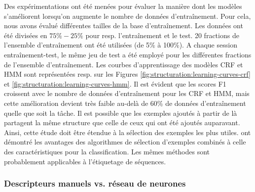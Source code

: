 Des expérimentations ont été menées pour évaluer la manière dont les modèles s'améliorent lorsqu'on augmente le nombre de données d'entraînement. Pour cela, nous avons évalué différentes tailles de la base d'entraînement. Les données ont été divisées en $75\%-25\%$ pour resp. l'entraînement et le test. 20 fractions de l'ensemble d'entraînement ont été utilisées  (de 5\% à 100\%). A chaque session entraînement-test, le même jeu de test a été employé pour les différentes fractions de l'ensemble d'entraînement. Les courbes d'apprentissage des modèles CRF et HMM sont représentées resp. sur les Figures \ref{fig:structuration:learning-curves-crf} et \ref{fig:structuration:learning-curves-hmm}. Il est évident que les scores F1 croissent avec le nombre de données d'entraînement pour les CRF et HMM, mais cette amélioration devient très faible au-delà de 60\% de données d'entraînement quelle que soit la tâche. Il est possible que les exemples ajoutés à partir de là partagent la même structure que celle de ceux qui ont été ajoutés auparavant. Ainsi, cette étude doit être étendue à la sélection des exemples les plus utiles. \citet{raman2003exampleSelection} ont démontré les avantages des algorithmes de sélection d'exemples combinés à celle des caractéristiques pour la classification. Les mêmes méthodes sont probablement applicables à l'étiquetage de séquences.



\subsubsection{Descripteurs manuels vs. réseau de neurones}

